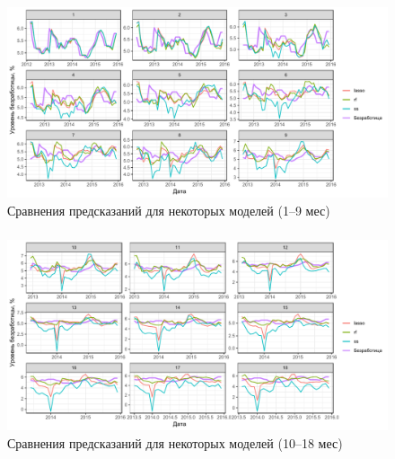\documentclass[c, dvipsnames]{beamer}  %
\begin{document}
\begin{frame}
\frametitle{\insertsection} 
\framesubtitle{\insertsubsection}
\begin{figure}
\caption{Сравнения предсказаний для некоторых моделей (1--9 мес)}
\includegraphics[width=\linewidth]{bl1.pdf}
\end{figure}
\end{frame}


\begin{frame}
\frametitle{\insertsection} 
\framesubtitle{\insertsubsection}
\begin{figure}
\caption{Сравнения предсказаний для некоторых моделей (10--18 мес)}
\includegraphics[width=\linewidth]{bl2.pdf}
\end{figure}
\end{frame}
 
\end{document}

